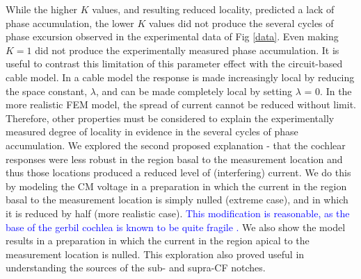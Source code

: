 \documentclass{biophys-new}
\begin{document}
\par{While the higher $K$ values, and resulting reduced locality, predicted a lack of phase accumulation, the lower $K$ values did not produce the several cycles of phase excursion observed in the experimental data of Fig \ref{data}.  Even  making $K = 1$ did not produce the experimentally measured phase accumulation. It is useful to contrast this limitation of this parameter effect with the circuit-based cable model.  In a cable model the response is made increasingly local by reducing the space constant, $\lambda$, and can be made completely local by setting $\lambda$ = 0.  In the more realistic FEM model, the spread of current cannot be reduced without limit.  Therefore, other properties must be considered to explain the experimentally measured degree of locality in evidence in the several cycles of phase accumulation.  We explored the second proposed explanation - that the cochlear responses were less robust in the region basal to the measurement location and thus those locations produced a reduced level of (interfering) current.  We do this by modeling the CM voltage in a preparation in which the current in the region basal to the measurement location is simply nulled (extreme case), and in which it is reduced by half (more realistic case). \textcolor{blue}{This modification is reasonable, as the base of the gerbil cochlea is known to be quite fragile \cite{overstreet}.} We also show the model results in a preparation in which the current in the region apical to the measurement location is nulled.  This exploration also proved useful in understanding the sources of the sub- and supra-CF notches.}
\end{document}
